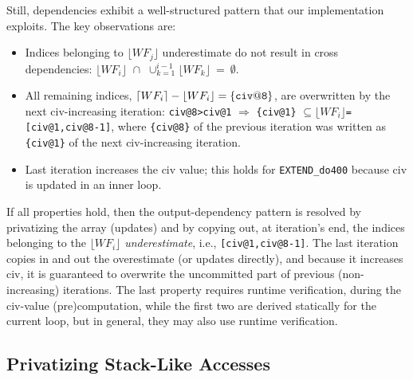 \documentclass{sig-alternate}
\begin{document}
Still, dependencies exhibit a well-structured pattern that our 
implementation exploits. The key observations are: 
\begin{itemize}
    \item Indices belonging to $\lfloor{}WF_{j}\rfloor$ underestimate  
            do not result in cross dependencies:
        $\lfloor WF_{i}\rfloor\mbox{~}\cap\mbox{~}\cup_{k=1}^{i-1}\lfloor WF_{k}\rfloor~=~\emptyset$.

    \item All remaining indices, 
        $\lceil WF_{i}\rceil - \lfloor WF_{i}\rfloor = {\tt\{civ@8\}}$,
        are overwritten by the next {\sc civ}-increasing iteration:
        {\tt{}civ@8>civ@1} $\Rightarrow$
        {\tt\{civ@1\}} $\subseteq\lfloor WF_{i}\rfloor${\tt=[civ@1,civ@8-1]},
        where {\tt\{civ@8\}} of the previous iteration was written as 
        {\tt\{civ@1\}} of the next {\sc civ}-increasing iteration.

    \item Last iteration increases the {\sc civ} value; this 
        holds for {\tt EXTEND\_do400} because {\sc civ} is 
        updated in an inner loop.
\end{itemize}

If all properties hold, then the output-dependency pattern is resolved 
by privatizing the array (updates) and by copying out, at 
iteration's end, the indices belonging to the $\lfloor WF_i\rfloor$ 
{\em underestimate}, i.e., {\tt[civ@1,civ@8-1]}.
The last iteration copies in and out the overestimate (or updates directly),
and because it increases {\sc civ}, it is guaranteed to overwrite the 
uncommitted part of previous (non-increasing) iterations.
%
The last property requires runtime verification, during the {\sc civ}-value
(pre)computation, while the first two are derived statically for the current 
loop, but in general, they may also use runtime verification.


\subsection{Privatizing Stack-Like Accesses} %
\label{sec:Stack}
\end{document}
